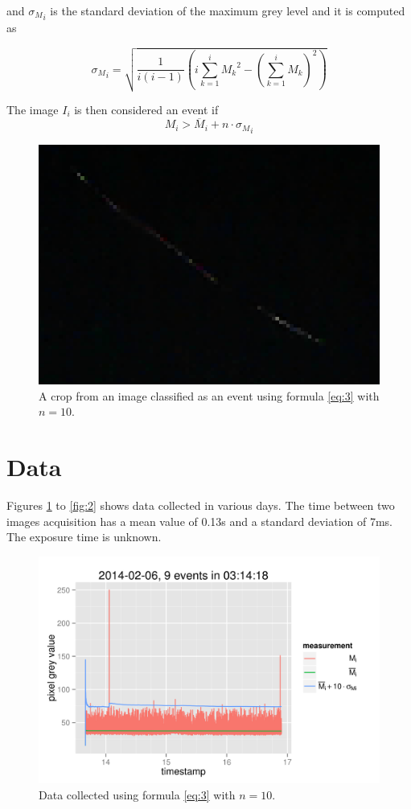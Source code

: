 \documentclass[a4paper,12pt]{article}
\begin{document}
 and ${\sigma_{M}}_{i}$ is the standard deviation of the maximum grey level and it is computed as

 $${\sigma_{M}}_{i}=\sqrt{\frac{1}{i(i-1)}\left(i\sum_{k=1}^i {M_k}^2-\left(\sum_{k=1}^i M_k\right)^2\right)}$$


The image $I_i$ is then considered an event if 
\begin{equation}
M_i>\overline{M}_i+n\cdot{\sigma_{M}}_{i}\label{eq:3}
\end{equation}

\begin{figure}[h!]
  \centering
  \includegraphics[scale=0.5]{bella.png}
  \caption{A crop from an image classified as an event using formula \ref{eq:3} with $n=10$.}
\end{figure}

\section{Data}
Figures \ref{fig:1} to \ref{fig:2} shows data collected in various days.
The time between two images acquisition has a mean value of 0.13s and a standard deviation of 7ms.
The exposure time is unknown.

\begin{figure}[h!]
  \centering
  \includegraphics{20140206.png}
  \caption{Data collected using formula \ref{eq:3} with $n=10$.}\label{fig:1}
\end{figure}
\end{document}
